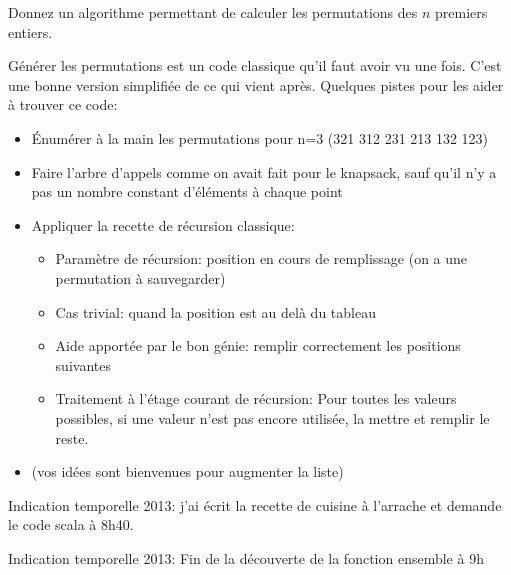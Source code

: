 \documentclass[10pt]{article}\usepackage[nu]{esial}
\begin{document}
\begin{Question}
  Donnez un algorithme permettant de calculer les permutations des $n$ premiers
  entiers.
\end{Question}
\begin{Reponse}
  Générer les permutations est un code classique qu'il faut avoir vu une
  fois. C'est une bonne version simplifiée de ce qui vient après.  Quelques
  pistes pour les aider à trouver ce code:
  \begin{itemize}
  \item Énumérer à la main les permutations pour n=3 (321 312 231 213 132 123)
  \item Faire l'arbre d'appels comme on avait fait pour le knapsack, sauf qu'il
    n'y a pas un nombre constant d'éléments à chaque point
  \item Appliquer la recette de récursion classique:
    \begin{itemize}
    \item Paramètre de récursion: position en cours de remplissage (on a une
      permutation à sauvegarder)
    \item Cas trivial: quand la position est au delà du tableau
    \item Aide apportée par le bon génie: remplir correctement les positions suivantes
    \item Traitement à l'étage courant de récursion: Pour toutes les valeurs
      possibles, si une valeur n'est pas encore utilisée, la mettre et remplir
      le reste.
    \end{itemize}
  \item (vos idées sont bienvenues pour augmenter la liste)
  \end{itemize}

  Indication temporelle 2013: j'ai écrit la recette de cuisine à l'arrache et
  demande le code scala à 8h40.
 
  \newcommand*\FancyVerbStopString{// Fin génération, début du test}

  Indication temporelle 2013: Fin de la découverte de la fonction ensemble à 9h
\end{Reponse}
\end{document}
